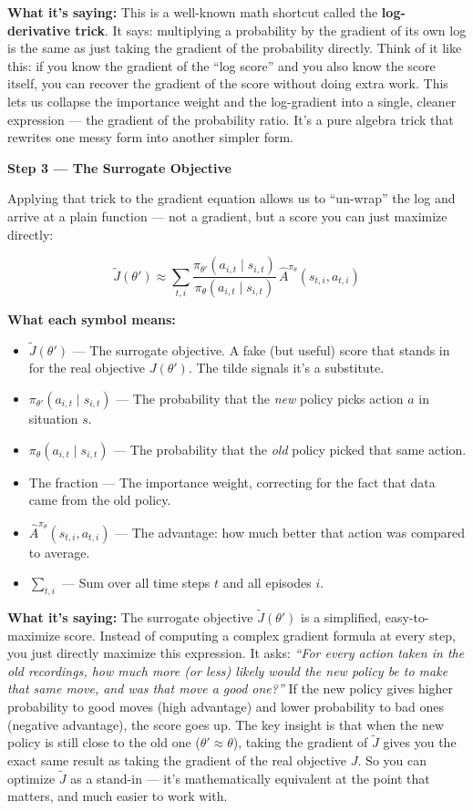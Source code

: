 \textbf{What it's saying:} This is a well-known math shortcut called the \textbf{log-derivative trick}. It says: multiplying a probability by the gradient of its own log is the same as just taking the gradient of the probability directly. Think of it like this: if you know the gradient of the ``log score'' and you also know the score itself, you can recover the gradient of the score without doing extra work. This lets us collapse the importance weight and the log-gradient into a single, cleaner expression --- the gradient of the probability ratio. It's a pure algebra trick that rewrites one messy form into another simpler form.

\bigskip

\textbf{Step 3 --- The Surrogate Objective}

Applying that trick to the gradient equation allows us to ``un-wrap'' the log and arrive at a plain
function --- not a gradient, but a score you can just maximize directly:

\[
\tilde{J}(\theta') \approx \sum_{t,i}
\frac{\pi_{\theta'}(a_{i,t} \mid s_{i,t})}{\pi_\theta(a_{i,t} \mid s_{i,t})}\,
\hat{A}^{\pi_\theta}(s_{t,i}, a_{t,i})
\]

\textbf{What each symbol means:}
\begin{itemize}
    \item $\tilde{J}(\theta')$ --- The surrogate objective. A fake (but useful) score that stands in for the real objective $J(\theta')$. The tilde signals it's a substitute.
    \item $\pi_{\theta'}(a_{i,t} \mid s_{i,t})$ --- The probability that the \textit{new} policy picks action $a$ in situation $s$.
    \item $\pi_\theta(a_{i,t} \mid s_{i,t})$ --- The probability that the \textit{old} policy picked that same action.
    \item The fraction --- The importance weight, correcting for the fact that data came from the old policy.
    \item $\hat{A}^{\pi_\theta}(s_{t,i}, a_{t,i})$ --- The advantage: how much better that action was compared to average.
    \item $\sum_{t,i}$ --- Sum over all time steps $t$ and all episodes $i$.
\end{itemize}

\textbf{What it's saying:} The surrogate objective $\tilde{J}(\theta')$ is a simplified, easy-to-maximize score. Instead of computing a complex gradient formula at every step, you just directly maximize this expression. It asks: \textit{``For every action taken in the old recordings, how much more (or less) likely would the new policy be to make that same move, and was that move a good one?''} If the new policy gives higher probability to good moves (high advantage) and lower probability to bad ones (negative advantage), the score goes up. The key insight is that when the new policy is still close to the old one ($\theta' \approx \theta$), taking the gradient of $\tilde{J}$ gives you the exact same result as taking the gradient of the real objective $J$. So you can optimize $\tilde{J}$ as a stand-in --- it's mathematically equivalent at the point that matters, and much easier to work with.

